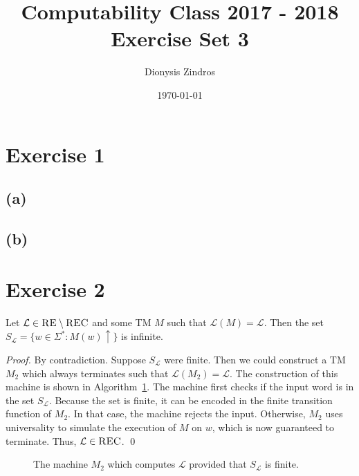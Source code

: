 \documentclass[11pt]{llncs}
\begin{document}
\title{
Computability Class 2017 - 2018\\
Exercise Set 3}
\date{\today}
\author{Dionysis Zindros\\
    }
\maketitle
\noindent
\makebox[\linewidth]{\small \today}

\thispagestyle{plain}

\section*{Exercise 1}
\subsection*{(a)}
\subsection*{(b)}

\section*{Exercise 2}
\begin{lemma}
Let $\mathcal{L} \in \textsc{RE} \setminus \textsc{REC}$ and some TM $M$ such
that $\mathcal{L}(M) = \mathcal{L}$. Then the set
$S_\mathcal{L} = \{w \in \Sigma^*: M(w)\uparrow\}$ is infinite.
\end{lemma}
\begin{proof}
By contradiction. Suppose $S_\mathcal{L}$ were finite. Then we could construct
a TM $M_2$ which always terminates such that $\mathcal{L}(M_2) = \mathcal{L}$.
The construction of this machine is shown in Algorithm~\ref{alg.ex2}. The
machine first checks if the input word is in the set $S_\mathcal{L}$. Because
the set is finite, it can be encoded in the finite transition function of $M_2$.
In that case, the machine rejects the input. Otherwise, $M_2$ uses universality
to simulate the execution of $M$ on $w$, which is now guaranteed to terminate.
Thus, $\mathcal{L} \in \textsc{REC}$.
\qed
\end{proof}

\begin{figure}[t]
\begin{algorithm}[H]
  \caption{\label{alg.ex2}
      The machine $M_2$ which computes $\mathcal{L}$
      provided that $S_\mathcal{L}$ is finite.
  }
  \begin{algorithmic}[1]
            \State{}
        \EndIf
        \State{}
      \EndFunction
  \end{algorithmic}
\end{algorithm}
\end{figure}
\end{document}
